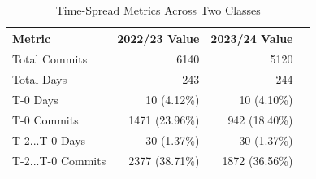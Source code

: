 \documentclass[10pt, conference]{IEEEtran}
\begin{document}
\begin{table}
\caption{Time-Spread Metrics Across Two Classes}\label{Tab:TimeMetrics}
\centering
\begin{tabular}{@{}lrrr@{}}
\toprule
\textbf{Metric}                      & \textbf{2022/23 Value} & \textbf{2023/24 Value} \\ \midrule
Total Commits                        & 6140                        & 5120                        \\
Total Days                           & 243                         & 244                         \\
T-0 Days                             & 10 (4.12\%)                 & 10 (4.10\%)                 \\
T-0 Commits                          & 1471 (23.96\%)              & 942 (18.40\%)               \\
T-2...T-0 Days                       & 30 (1.37\%)                 & 30 (1.37\%)                 \\
T-2...T-0 Commits                    & 2377 (38.71\%)              & 1872 (36.56\%)              \\ \bottomrule
\end{tabular}
\end{table}
\end{document}
